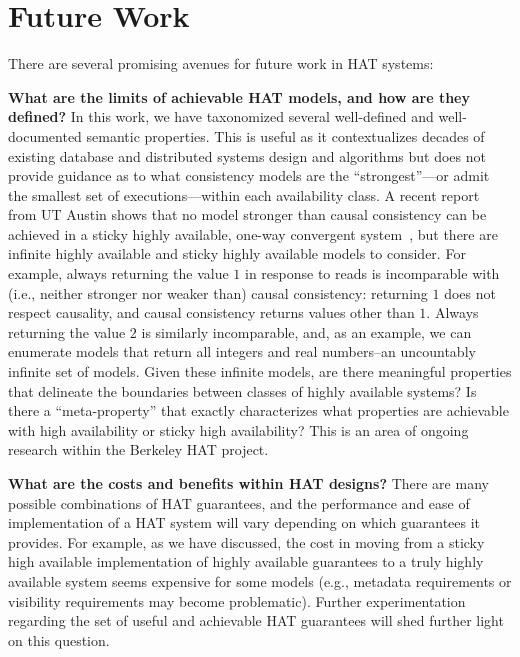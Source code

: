 
\section{Future Work}
\label{sec:futurework}

There are several promising avenues for future work in HAT systems:

\textbf{What are the limits of achievable HAT models, and how are they
  defined?}  In this work, we have taxonomized several well-defined
and well-documented semantic properties. This is useful as it
contextualizes decades of existing database and distributed systems
design and algorithms but does not provide guidance as to what
consistency models are the ``strongest''---or admit the smallest set
of executions---within each availability class. A recent report from
UT Austin shows that no model stronger than causal consistency can be
achieved in a sticky highly available, one-way convergent
system~\cite{cac}, but there are infinite highly available and sticky
highly available models to consider. For example, always returning the
value $1$ in response to reads is incomparable with (i.e., neither
stronger nor weaker than) causal consistency: returning $1$ does not
respect causality, and causal consistency returns values other than
$1$. Always returning the value $2$ is similarly incomparable, and, as
an example, we can enumerate models that return all integers and real
numbers--an uncountably infinite set of models. Given these infinite
models, are there meaningful properties that delineate the boundaries
between classes of highly available systems? Is there a
``meta-property'' that exactly characterizes what properties are
achievable with high availability or sticky high availability? This is
an area of ongoing research within the Berkeley HAT project.

\textbf{What are the costs and benefits within HAT designs?} There are
many possible combinations of HAT guarantees, and the performance and
ease of implementation of a HAT system will vary depending on which
guarantees it provides. For example, as we have discussed, the cost in
moving from a sticky high available implementation of highly available
guarantees to a truly highly available system seems expensive for some
models (e.g., metadata requirements or visibility requirements may
become problematic). Further experimentation regarding the set of
useful and achievable HAT guarantees will shed further light on this
question.

